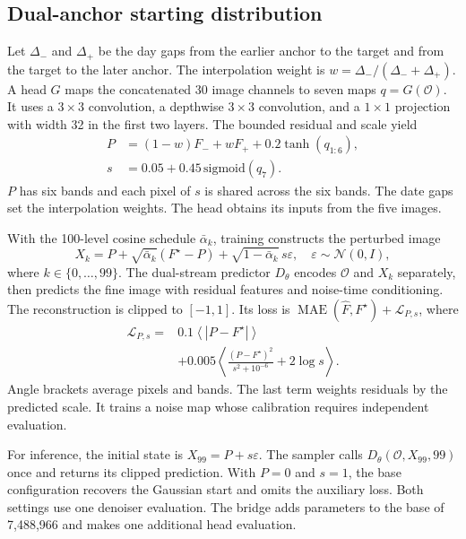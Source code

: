 \documentclass{article}
\newcommand{\obs}{\mathcal{O}}
\newcommand{\target}{F^\star}
\begin{document}
\subsection{Dual-anchor starting distribution}
Let $\Delta_-$ and $\Delta_+$ be the day gaps from the earlier anchor to the target and from the target to the later anchor. The interpolation weight is $w=\Delta_-/(\Delta_-+\Delta_+)$. A head $G$ maps the concatenated 30 image channels to seven maps $q=G(\obs)$. It uses a $3\times3$ convolution, a depthwise $3\times3$ convolution, and a $1\times1$ projection with width 32 in the first two layers. The bounded residual and scale yield
\begin{align}
P&=(1-w)F_-+wF_++0.2\tanh(q_{1:6}),\\
s&=0.05+0.45\,\mathrm{sigmoid}(q_7).
\end{align}
$P$ has six bands and each pixel of $s$ is shared across the six bands. The date gaps set the interpolation weights. The head obtains its inputs from the five images.

With the 100-level cosine schedule $\bar\alpha_k$, training constructs the perturbed image
\begin{equation}
X_k=P+\sqrt{\bar\alpha_k}(\target-P)
       +\sqrt{1-\bar\alpha_k}\,s\varepsilon,\quad
\varepsilon\sim\mathcal{N}(0,I),
\label{eq:bridge}
\end{equation}
where $k\in\{0,\ldots,99\}$. The dual-stream predictor $D_\theta$ encodes $\obs$ and $X_k$ separately, then predicts the fine image with residual features and noise-time conditioning. The reconstruction is clipped to $[-1,1]$. Its loss is $\operatorname{MAE}(\widehat{F},\target)+\mathcal{L}_{P,s}$, where
\begin{align}
\mathcal{L}_{P,s}={}&0.1\left\langle |P-\target|\right\rangle\\
&+0.005\left\langle
\frac{(P-\target)^2}{s^2+10^{-6}}+2\log s\right\rangle .
\end{align}
Angle brackets average pixels and bands. The last term weights residuals by the predicted scale. It trains a noise map whose calibration requires independent evaluation.

For inference, the initial state is $X_{99}=P+s\varepsilon$. The sampler calls $D_\theta(\obs,X_{99},99)$ once and returns its clipped prediction. With $P=0$ and $s=1$, the base configuration recovers the Gaussian start and omits the auxiliary loss. Both settings use one denoiser evaluation. The bridge adds \BridgeExtraParams{} parameters to the base of 7,488,966 and makes one additional head evaluation.
\end{document}
